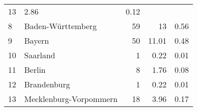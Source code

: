 \begin{longtable}{lXrrr}
       \num{13} &
       \num[round-mode=places,round-precision=2]{2.86} &
         \num[round-mode=places,round-precision=2]{0.12} \\

     8 &
     \multicolumn{1}{X}{ Baden-Württemberg   } &


       \num{59} &
       \num[round-mode=places,round-precision=2]{13} &
         \num[round-mode=places,round-precision=2]{0.56} \\

     9 &
     \multicolumn{1}{X}{ Bayern   } &


       \num{50} &
       \num[round-mode=places,round-precision=2]{11.01} &
         \num[round-mode=places,round-precision=2]{0.48} \\

     10 &
     \multicolumn{1}{X}{ Saarland   } &


       \num{1} &
       \num[round-mode=places,round-precision=2]{0.22} &
         \num[round-mode=places,round-precision=2]{0.01} \\

     11 &
     \multicolumn{1}{X}{ Berlin   } &


       \num{8} &
       \num[round-mode=places,round-precision=2]{1.76} &
         \num[round-mode=places,round-precision=2]{0.08} \\

     12 &
     \multicolumn{1}{X}{ Brandenburg   } &


       \num{1} &
       \num[round-mode=places,round-precision=2]{0.22} &
         \num[round-mode=places,round-precision=2]{0.01} \\

     13 &
     \multicolumn{1}{X}{ Mecklenburg-Vorpommern   } &


       \num{18} &
       \num[round-mode=places,round-precision=2]{3.96} &
         \num[round-mode=places,round-precision=2]{0.17} \\


\end{longtable}
